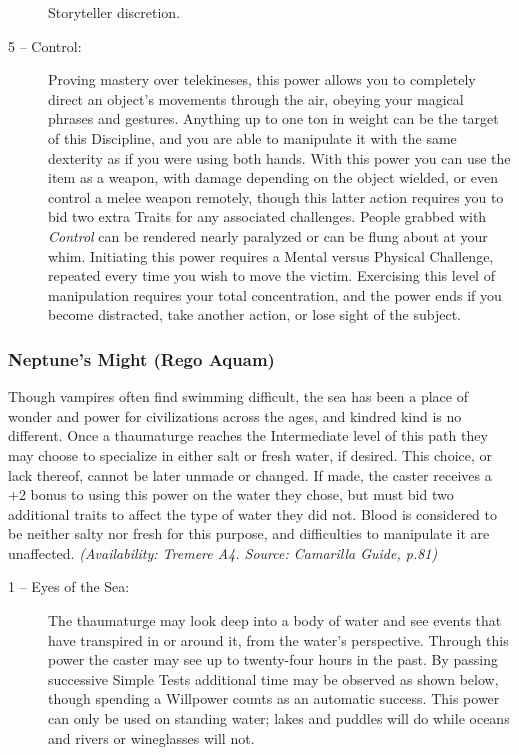 \begin{description}
	Storyteller discretion.
	\item[5 -- Control:]  Proving mastery over telekineses, this power allows you to completely direct an object's 
	movements through the air, obeying your magical phrases and gestures.  Anything up to one ton in weight can be 
	the target of this Discipline, and you are able to manipulate it with the same dexterity as if you were using 
	both hands.  With this power you can use the item as a weapon, with damage depending on the object wielded, or 
	even control a melee weapon remotely, though this latter action requires you to bid two extra Traits for any 
	associated challenges.  People grabbed with \emph{Control} can be rendered nearly paralyzed or can be flung about 
	at your whim.  Initiating this power requires a Mental versus Physical Challenge, repeated every time you wish 
	to move the victim.  Exercising this level of manipulation requires your total concentration, and the power ends 
	if you become distracted, take another action, or lose sight of the subject.
\end{description}

\subsubsection{Neptune's Might (Rego Aquam)}
Though vampires often find swimming difficult, the sea has been a place of wonder and power for civilizations 
across the ages, and kindred kind is no different.  Once a thaumaturge reaches the Intermediate level of this 
path they may choose to specialize in either salt or fresh water, if desired.  This choice, or lack thereof, 
cannot be later unmade or changed.  If made, the caster receives a +2 bonus to using this power on the water 
they chose, but must bid two additional traits to affect the type of water they did not.  Blood is considered 
to be neither salty nor fresh for this purpose, and difficulties to manipulate it are unaffected.  
\emph{(Availability:  Tremere A4.  Source:  Camarilla Guide, p.81)}

\begin{description}
	\item[1 -- Eyes of the Sea:]  The thaumaturge may look deep into a body of water and see events that have 
	transpired in or around it, from the water's perspective.  Through this power the caster may see up to 
	twenty-four hours in the past.  By passing successive Simple Tests additional time may be observed as shown 
	below, though spending a Willpower counts as an automatic success.  This power can only be used on standing 
	water; lakes and puddles will do while oceans and rivers or wineglasses will not.
\end{description}

